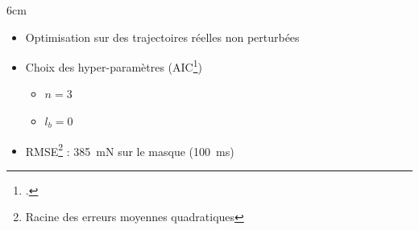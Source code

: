 \documentclass[10pt,xcolor=table]{beamer}
\begin{document}
\begin{frame}
\begin{textblock*}{6cm}
\begin{itemize}
			\item<7-> Optimisation sur des trajectoires réelles non perturbées
			\item<9-> Choix des hyper-paramètres (AIC\footcite{akaike_fitting_1969})%
			\begin{itemize}%
				\item<10-> $n=3$
				\item<10-> $l_b=0$
			\end{itemize}
			\item<11-> RMSE\footnote{Racine des erreurs moyennes quadratiques} : \SI{385}{\milli\newton} sur le masque (\SI{100}{\milli\second})
		\end{itemize}
	\end{textblock*}
\end{frame}

\end{document}
